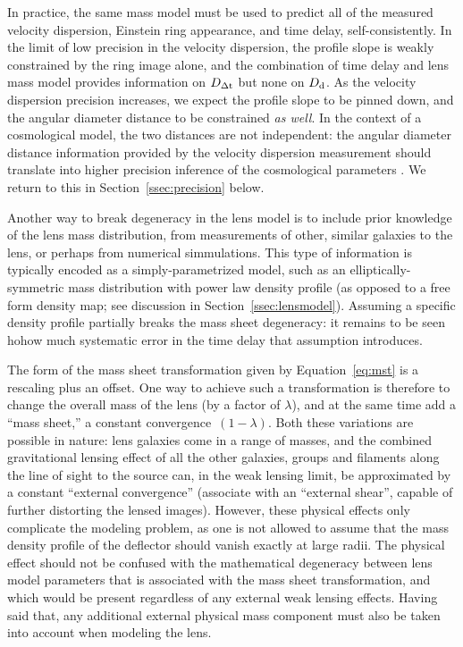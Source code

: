 In practice, the same mass model must be used to predict all of the
measured velocity dispersion, Einstein ring appearance, and time
delay, self-consistently. In the limit of low precision in the
velocity dispersion, the profile slope is weakly constrained by the
ring image alone, and the combination of time delay and lens mass
model provides information on $D_{\Delta{\rm t}}$ but none on $D_{\rm d}$. As the
velocity dispersion precision increases, we expect the profile slope
to be pinned down, and the angular diameter distance to be constrained
{\it as well}. In the context of a cosmological model, the two
distances are not independent: the angular diameter distance
information provided by the velocity dispersion measurement should
translate into higher precision inference of the cosmological
parameters \citep{JeeEtal2016}.  We return to this in
Section~\ref{ssec:precision} below.

Another way to break degeneracy in the lens model is to include prior
knowledge of the lens mass distribution, from measurements of other,
similar galaxies to the lens, or perhaps from numerical
simmulations. This type of information is typically encoded as a
simply-parametrized model, such as an elliptically-symmetric mass
distribution with power law density profile (as opposed to a free form
density map; see discussion in Section~\ref{ssec:lensmodel}). Assuming
a specific density profile partially breaks the mass sheet degeneracy:
it remains to be seen hohow much systematic error in the time delay
that assumption introduces.


The form of the mass sheet transformation given by
Equation~\ref{eq:mst} is a rescaling plus an offset. One way to
achieve such a transformation is therefore to change the overall mass
of the lens (by a factor of $\lambda$), and at the same time add a
``mass sheet,'' a constant convergence~$(1-\lambda)$.  Both these
variations are possible in nature: lens galaxies come in a range of
masses, and the combined gravitational lensing effect of all the other
galaxies, groups and filaments along the line of sight to the source
can, in the weak lensing limit, be approximated by a constant
``external convergence'' (associate with an ``external shear'',
capable of further distorting the lensed images). However, these
physical effects only complicate the modeling problem, as one is not
allowed to assume that the mass density profile of the deflector
should vanish exactly at large radii.  The physical effect should not
be confused with the mathematical degeneracy between lens model
parameters that is associated with the mass sheet transformation, and
which would be present regardless of any external weak lensing
effects. Having said that, any additional external physical mass
component must also be taken into account when modeling the lens.

